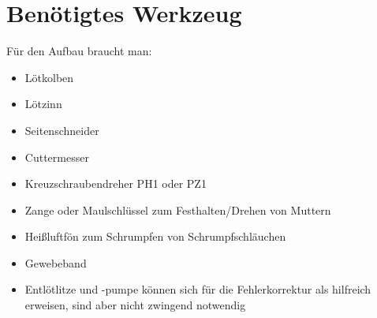 \documentclass[paper=a4, open=any]{scrbook}
\begin{document}
		\section{Benötigtes Werkzeug}
			Für den Aufbau braucht man:
			\begin{itemize}
				\item Lötkolben
				\item Lötzinn
				\item Seitenschneider
				\item Cuttermesser
				\item Kreuzschraubendreher PH1 oder PZ1
				\item Zange oder Maulschlüssel zum Festhalten/Drehen von Muttern
				\item Heißluftfön zum Schrumpfen von Schrumpfschläuchen
				\item Gewebeband
				\item Entlötlitze und -pumpe können sich für die Fehlerkorrektur als hilfreich erweisen, sind aber nicht zwingend notwendig
			\end{itemize}
\end{document}

